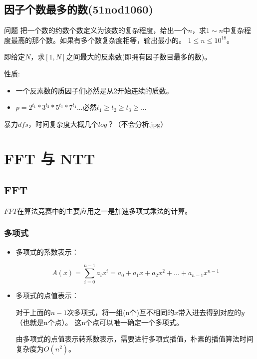 \subsection{因子个数最多的数(51nod1060)}
\begin{custom}{问题}
把一个数的约数个数定义为该数的复杂程度，给出一个$n$，求$1\sim n$中复杂程度最高的那个数。如果有多个数复杂度相等，输出最小的。
$1\le n\le 10^{18}$。

即给定$N$，求$[1,N]$之间最大的反素数({\heiti 即拥有因子数目最多的数})。
\end{custom}

\begin{solution}
性质:
\begin{itemize}
	\item 一个反素数的质因子们必然是从2开始连续的质数。 
	\item $p=2^{t_1} * 3^{t_2} * 5^{t_3} * 7^{t_4}$...必然$t_1 \ge t_2 \ge t_3 \ge ...$
\end{itemize}

暴力$dfs$，时间复杂度大概几个$log$？（不会分析.jpg）
\end{solution}






\section{FFT 与 NTT}
\subsection{FFT}
$FFT$在算法竞赛中的主要应用之一是加速多项式乘法的计算。

\subsubsection{多项式}
\begin{itemize}
\item 多项式的系数表示：

$$A(x)=\sum_{i=0}^{n-1}a_ix^i=a_0+a_1x+a_2x^2+...+a_{n-1}x^{n-1}$$

\item 多项式的点值表示：

对于上面的$n-1$次多项式，将一组(n个)互不相同的$x$带入进去得到对应的$y$（也就是n个点）。
这{\heiti n个点可以唯一确定一个多项式}。

\begin{note}
由多项式的点值表示转系数表示，需要进行多项式插值，朴素的插值算法时间复杂度为$O(n^2)$。
\end{note}
\end{itemize}

